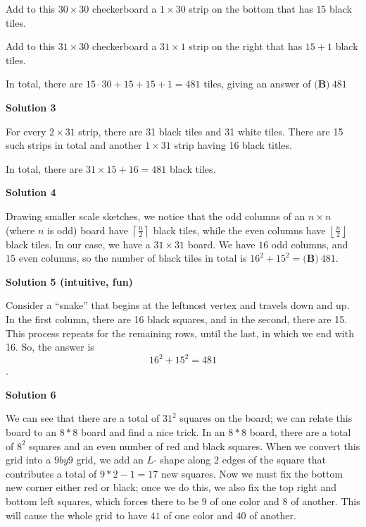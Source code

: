 \begin{enumerate}
 Add to this $30 \times 30$ checkerboard a $1 \times 30$ strip on the bottom that has $15$ black tiles.

 Add to this $31 \times 30$ checkerboard a $31 \times 1$ strip on the right that has $15 + 1$ black tiles.

 In total, there are $15 \cdot 30 + 15 + 15 + 1 = 481$ tiles, giving an answer of $\boxed{\textbf{(B)}\ 481}$




\textbf{Solution 3}

For every $2 \times 31$ strip, there are 31 black tiles and 31 white tiles. There are 15 such strips in total and another $1 \times 31$ strip having 16 black titles.

 In total, there are $31\times 15+16=481$ black tiles.

 



\textbf{Solution 4}

Drawing smaller scale sketches, we notice that the odd columns of an $n \times n$ (where $n$ is odd) board have $\left \lceil \frac{n}{2} \right \rceil$ black tiles, while the even columns have $\left \lfloor \frac{n}{2} \right \rfloor$ black tiles. In our case, we have a $31 \times 31$ board. We have $16$ odd columns, and $15$ even columns, so the number of black tiles in total is $16^2 + 15^2 = \boxed{\textbf{(B)}\ 481}$.

 



\textbf{Solution 5 (intuitive, fun)}

Consider a “snake” that begins at the leftmost vertex and travels down and up. In the first column, there are 16 black squares, and in the second, there are 15. This process repeats for the remaining rows, until the last, in which we end with 16. So, the answer is 
 \[16^2 + 15^2 = \boxed{481}\].

 



\textbf{Solution 6}

We can see that there are a total of $31^2$ squares on the board; we can relate this board to an $8 * 8$ board and find a nice trick. In an $8 * 8$ board, there are a total of $8^2$ squares and an even number of red and black squares. When we convert this grid into a $9 by 9$ grid, we add an $L$- shape along $2$ edges of the square that contributes a total of $9*2 -1=17$ new squares. Now we must fix the bottom new corner either red or black; once we do this, we also fix the top right and bottom left squares, which forces there to be $9$ of one color and $8$ of another. This will cause the whole grid to have $41$ of one color and $40$ of another.


\end{enumerate}
